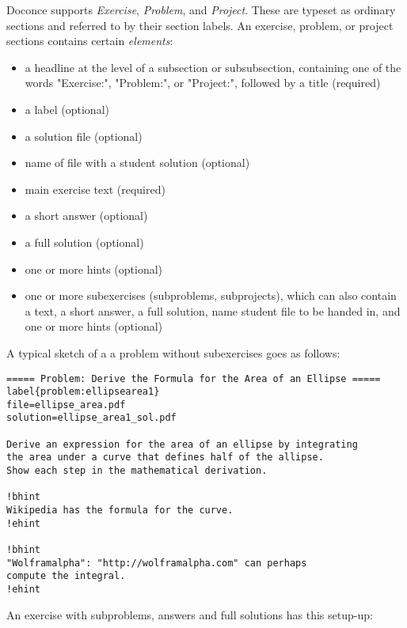 \documentclass[%
oneside,                 %
final,                   %
10pt]{article}
\begin{document}
Doconce supports \emph{Exercise}, \emph{Problem}, and \emph{Project}. These are typeset
as ordinary sections and referred to by their section labels.
An exercise, problem, or project sections contains certain \emph{elements}:

\begin{itemize}
  \item a headline at the level of a subsection or subsubsection,
    containing one of the words "Exercise:", "Problem:", or
    "Project:", followed by a title (required)

  \item a label (optional)

  \item a solution file (optional)

  \item name of file with a student solution (optional)

  \item main exercise text (required)

  \item a short answer (optional)

  \item a full solution (optional)

  \item one or more hints (optional)

  \item one or more subexercises (subproblems, subprojects), which can also
    contain a text, a short answer, a full solution, name student file
    to be handed in, and one or more hints (optional)
\end{itemize}

\noindent
A typical sketch of a a problem without subexercises goes as follows:
\begin{Verbatim}[numbers=none,fontsize=\fontsize{9pt}{9pt},baselinestretch=0.85,xleftmargin=0mm]
===== Problem: Derive the Formula for the Area of an Ellipse =====
label{problem:ellipsearea1}
file=ellipse_area.pdf
solution=ellipse_area1_sol.pdf

Derive an expression for the area of an ellipse by integrating
the area under a curve that defines half of the allipse.
Show each step in the mathematical derivation.

!bhint
Wikipedia has the formula for the curve.
!ehint

!bhint
"Wolframalpha": "http://wolframalpha.com" can perhaps
compute the integral.
!ehint
\end{Verbatim}
An exercise with subproblems, answers and full solutions has this
setup-up:
\end{document}
